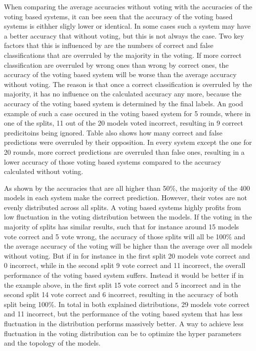 When comparing the average accuracies without voting with the accuracies of the voting based systems, it can bee seen that the accuracy of the voting based systems is eithher sligly lower or identical. In some cases such a system may have a better accuracy that without voting, but this is not always the case. Two key factors that this is influenced by are the numbers of correct and false classifications that are overruled by the majority in the voting. If more correct classification are overruled by wrong ones than wrong by correct ones, the accuracy of the voting based system will be worse than the average accuracy without voting. The reason is that once a correct classification is overruled by the majority, it has no influence on the calculated accuracy any more, because the accuracy of the voting based system is determined by the final labels. An good example of such a case occured in the voting based system for 5 rounds, where in one of the splits, 11 out of the 20 models voted incorrect, resulting in 9 correct predicitoins being ignored. Table  also shows how many correct and false predictions were overruled by their opposition. In every system except the one for 20 rounds, more correct predictions are overruled than false ones, resulting in a lower accuracy of those voting based systems compared to the accuracy calculated without voting. 

As shown by the accuracies that are all higher than 50\%, the majority of the 400 models in each system make the correct prediction. However, their votes are not evenly distributed across all splits. A voting based systems highly profits from low fluctuation in the voting distribution between the models. If the voting in the majority of splits has similar results, such that for instance around 15 models vote correct and 5 vote wrong, the accuracy of those splits will all be 100\% and the average accuracy of the voting will be higher than the average over all models without voting. But if in for instance in the first split 20 models vote correct and 0 incorrect, while in the second split 9 vote correct and 11 incorrect, the overall performance of the voting based system suffers. Instead it would be better if in the example above, in the first split 15 vote correct and 5 incorrect and in the second split 14 vote correct and 6 incorrect, resulting in the accuracy of both split being 100\%. In total in both explained distributions, 29 models vote correct and 11 incorrect, but the performance of the voting based system that has less fluctuation in the distribution performs massively better. A way to achieve less fluctuation in the voting distribution can be to optimize the hyper parameters and the topology of the models.

